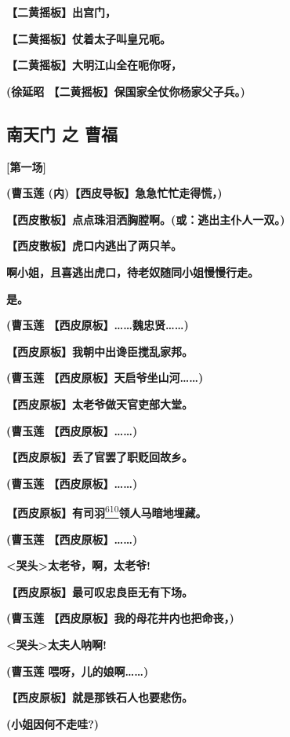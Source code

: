 \textbf{【二黄摇板】出宫门，}

\textbf{【二黄摇板】仗着太子叫皇兄呃。}

\textbf{【二黄摇板】大明江山全在呃你呀，}

\textbf{(徐延昭 【二黄摇板】保国家全仗你杨家父子兵。)}

\hypertarget{ux5357ux5929ux95e8-ux4e4b-ux66f9ux798f}{%
\subsection{南天门 之
曹福}\label{ux5357ux5929ux95e8-ux4e4b-ux66f9ux798f}}

\textbf{{[}第一场{]}}

\textbf{(曹玉莲 (内)【西皮导板】急急忙忙走得慌，)}

\textbf{【西皮散板】点点珠泪洒胸膛啊。(或：逃出主仆人一双。)}

\textbf{【西皮散板】虎口内逃出了两只羊。}

\textbf{啊小姐，且喜逃出虎口，待老奴随同小姐慢慢行走。}

\textbf{是。}

\textbf{(曹玉莲 【西皮原板】\ldots{}\ldots{}魏忠贤\ldots{}\ldots{})}

\textbf{【西皮原板】我朝中出谗臣搅乱家邦。}

\textbf{(曹玉莲 【西皮原板】天启爷坐山河\ldots{}\ldots{})}

\textbf{【西皮原板】太老爷做天官吏部大堂。}

\textbf{(曹玉莲 【西皮原板】\ldots{}\ldots{})}

\textbf{【西皮原板】丢了官罢了职贬回故乡。}

\textbf{(曹玉莲 【西皮原板】\ldots{}\ldots{})}

\textbf{【西皮原板】有司羽}\protect\hyperlink{fn610}{\textsuperscript{610}}\textbf{领人马暗地埋藏。}

\textbf{(曹玉莲 【西皮原板】\ldots{}\ldots{})}

\textbf{\textless{}哭头\textgreater{}太老爷，啊，太老爷!}

\textbf{【西皮原板】最可叹忠良臣无有下场。}

\textbf{(曹玉莲 【西皮原板】我的母花井内也把命丧，)}

\textbf{\textless{}哭头\textgreater{}太夫人呐啊!}

\textbf{(曹玉莲 喂呀，儿的娘啊\ldots{}\ldots{})}

\textbf{【西皮原板】就是那铁石人也要悲伤。}

\textbf{(小姐因何不走哇?)}

